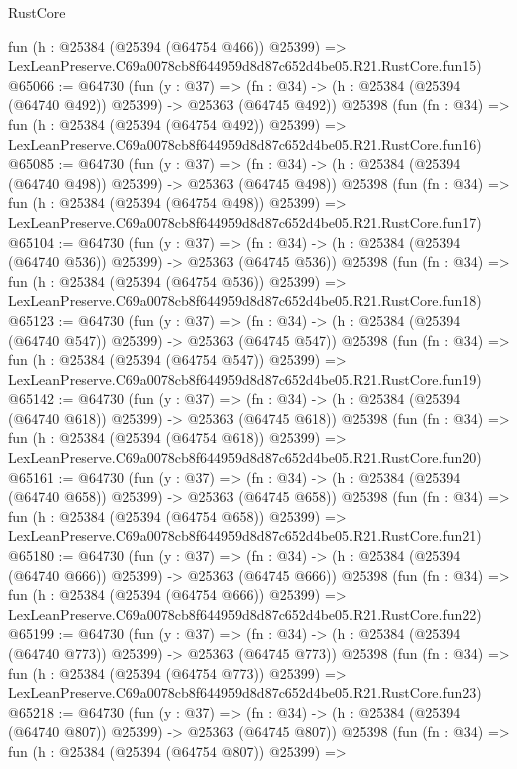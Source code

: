 \begin{lexlean}{RustCore}
\begin{coremodule}
    fun (h : @25384 (@25394 (@64754 @466)) @25399) =>
    LexLeanPreserve.C69a0078cb8f644959d8d87c652d4be05.R21.RustCore.fun15)
@65066 := @64730
    (fun (y : @37) =>
    (fn : @34) -> (h : @25384 (@25394 (@64740 @492)) @25399) -> @25363 (@64745 @492))
    @25398
    (fun (fn : @34) =>
    fun (h : @25384 (@25394 (@64754 @492)) @25399) =>
    LexLeanPreserve.C69a0078cb8f644959d8d87c652d4be05.R21.RustCore.fun16)
@65085 := @64730
    (fun (y : @37) =>
    (fn : @34) -> (h : @25384 (@25394 (@64740 @498)) @25399) -> @25363 (@64745 @498))
    @25398
    (fun (fn : @34) =>
    fun (h : @25384 (@25394 (@64754 @498)) @25399) =>
    LexLeanPreserve.C69a0078cb8f644959d8d87c652d4be05.R21.RustCore.fun17)
@65104 := @64730
    (fun (y : @37) =>
    (fn : @34) -> (h : @25384 (@25394 (@64740 @536)) @25399) -> @25363 (@64745 @536))
    @25398
    (fun (fn : @34) =>
    fun (h : @25384 (@25394 (@64754 @536)) @25399) =>
    LexLeanPreserve.C69a0078cb8f644959d8d87c652d4be05.R21.RustCore.fun18)
@65123 := @64730
    (fun (y : @37) =>
    (fn : @34) -> (h : @25384 (@25394 (@64740 @547)) @25399) -> @25363 (@64745 @547))
    @25398
    (fun (fn : @34) =>
    fun (h : @25384 (@25394 (@64754 @547)) @25399) =>
    LexLeanPreserve.C69a0078cb8f644959d8d87c652d4be05.R21.RustCore.fun19)
@65142 := @64730
    (fun (y : @37) =>
    (fn : @34) -> (h : @25384 (@25394 (@64740 @618)) @25399) -> @25363 (@64745 @618))
    @25398
    (fun (fn : @34) =>
    fun (h : @25384 (@25394 (@64754 @618)) @25399) =>
    LexLeanPreserve.C69a0078cb8f644959d8d87c652d4be05.R21.RustCore.fun20)
@65161 := @64730
    (fun (y : @37) =>
    (fn : @34) -> (h : @25384 (@25394 (@64740 @658)) @25399) -> @25363 (@64745 @658))
    @25398
    (fun (fn : @34) =>
    fun (h : @25384 (@25394 (@64754 @658)) @25399) =>
    LexLeanPreserve.C69a0078cb8f644959d8d87c652d4be05.R21.RustCore.fun21)
@65180 := @64730
    (fun (y : @37) =>
    (fn : @34) -> (h : @25384 (@25394 (@64740 @666)) @25399) -> @25363 (@64745 @666))
    @25398
    (fun (fn : @34) =>
    fun (h : @25384 (@25394 (@64754 @666)) @25399) =>
    LexLeanPreserve.C69a0078cb8f644959d8d87c652d4be05.R21.RustCore.fun22)
@65199 := @64730
    (fun (y : @37) =>
    (fn : @34) -> (h : @25384 (@25394 (@64740 @773)) @25399) -> @25363 (@64745 @773))
    @25398
    (fun (fn : @34) =>
    fun (h : @25384 (@25394 (@64754 @773)) @25399) =>
    LexLeanPreserve.C69a0078cb8f644959d8d87c652d4be05.R21.RustCore.fun23)
@65218 := @64730
    (fun (y : @37) =>
    (fn : @34) -> (h : @25384 (@25394 (@64740 @807)) @25399) -> @25363 (@64745 @807))
    @25398
    (fun (fn : @34) =>
    fun (h : @25384 (@25394 (@64754 @807)) @25399) =>

\end{coremodule}
\end{lexlean}
